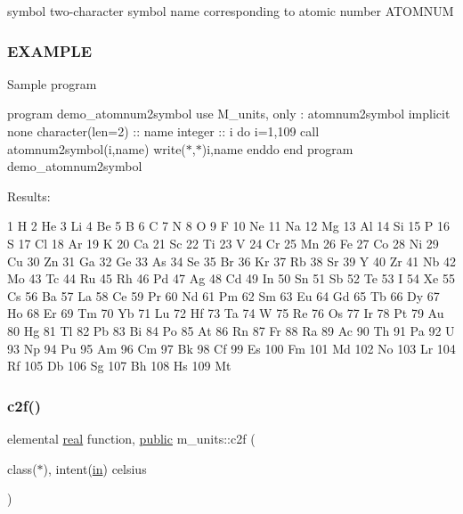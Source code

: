 symbol two-\/character symbol name corresponding to atomic number A\+T\+O\+M\+N\+UM

\subsubsection*{E\+X\+A\+M\+P\+LE}

Sample program

program demo\+\_\+atomnum2symbol use M\+\_\+units, only \+: atomnum2symbol implicit none character(len=2) \+:\+: name integer \+:\+: i do i=1,109 call atomnum2symbol(i,name) write($\ast$,$\ast$)i,name enddo end program demo\+\_\+atomnum2symbol

Results\+: \begin{DoxyVerb}     1 H
     2 He
     3 Li
     4 Be
     5 B
     6 C
     7 N
     8 O
     9 F
    10 Ne
    11 Na
    12 Mg
    13 Al
    14 Si
    15 P
    16 S
    17 Cl
    18 Ar
    19 K
    20 Ca
    21 Sc
    22 Ti
    23 V
    24 Cr
    25 Mn
    26 Fe
    27 Co
    28 Ni
    29 Cu
    30 Zn
    31 Ga
    32 Ge
    33 As
    34 Se
    35 Br
    36 Kr
    37 Rb
    38 Sr
    39 Y
    40 Zr
    41 Nb
    42 Mo
    43 Tc
    44 Ru
    45 Rh
    46 Pd
    47 Ag
    48 Cd
    49 In
    50 Sn
    51 Sb
    52 Te
    53 I
    54 Xe
    55 Cs
    56 Ba
    57 La
    58 Ce
    59 Pr
    60 Nd
    61 Pm
    62 Sm
    63 Eu
    64 Gd
    65 Tb
    66 Dy
    67 Ho
    68 Er
    69 Tm
    70 Yb
    71 Lu
    72 Hf
    73 Ta
    74 W
    75 Re
    76 Os
    77 Ir
    78 Pt
    79 Au
    80 Hg
    81 Tl
    82 Pb
    83 Bi
    84 Po
    85 At
    86 Rn
    87 Fr
    88 Ra
    89 Ac
    90 Th
    91 Pa
    92 U
    93 Np
    94 Pu
    95 Am
    96 Cm
    97 Bk
    98 Cf
    99 Es
   100 Fm
   101 Md
   102 No
   103 Lr
   104 Rf
   105 Db
   106 Sg
   107 Bh
   108 Hs
   109 Mt \end{DoxyVerb}
 \mbox{\label{namespacem__units_a652a2565824ce7cbc692b563054ffa3e}} 
\subsubsection{\texorpdfstring{c2f()}{c2f()}}
{\footnotesize\ttfamily elemental \hyperlink{read__watch_83_8txt_abdb62bde002f38ef75f810d3a905a823}{real} function, \hyperlink{M__stopwatch_83_8txt_a2f74811300c361e53b430611a7d1769f}{public} m\+\_\+units\+::c2f (\begin{DoxyParamCaption}\item[{class($\ast$), intent(\hyperlink{M__journal_83_8txt_afce72651d1eed785a2132bee863b2f38}{in})}]{celsius }\end{DoxyParamCaption})}



